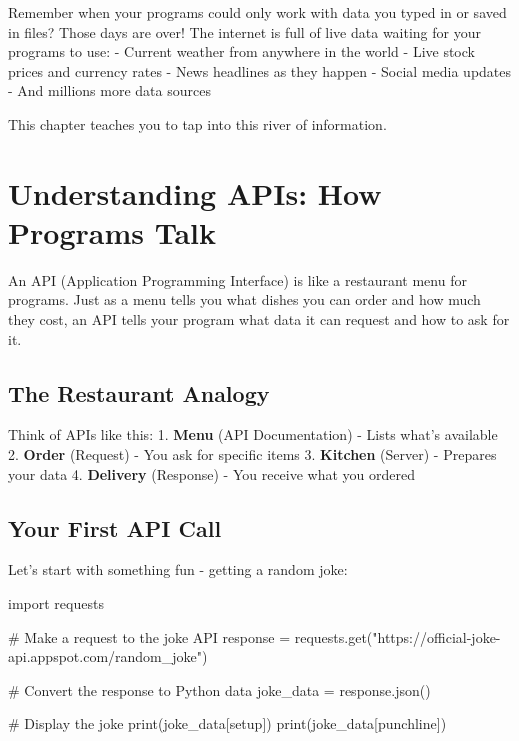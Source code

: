 \documentclass[
  letterpaper,
  DIV=11,
  numbers=noendperiod,
  oneside]{scrreprt}
\newenvironment{Shaded}{}{}
\newcommand{\BuiltInTok}[1]{\textcolor[rgb]{0.84,0.23,0.29}{#1}}
\newcommand{\CommentTok}[1]{\textcolor[rgb]{0.42,0.45,0.49}{#1}}
\newcommand{\ImportTok}[1]{\textcolor[rgb]{0.01,0.18,0.38}{#1}}
\newcommand{\NormalTok}[1]{\textcolor[rgb]{0.14,0.16,0.18}{#1}}
\newcommand{\OperatorTok}[1]{\textcolor[rgb]{0.14,0.16,0.18}{#1}}
\newcommand{\StringTok}[1]{\textcolor[rgb]{0.01,0.18,0.38}{#1}}
\begin{document}
Remember when your programs could only work with data you typed in or
saved in files? Those days are over! The internet is full of live data
waiting for your programs to use: - Current weather from anywhere in the
world - Live stock prices and currency rates - News headlines as they
happen - Social media updates - And millions more data sources

This chapter teaches you to tap into this river of information.

\section{Understanding APIs: How Programs
Talk}\label{understanding-apis-how-programs-talk}

An API (Application Programming Interface) is like a restaurant menu for
programs. Just as a menu tells you what dishes you can order and how
much they cost, an API tells your program what data it can request and
how to ask for it.

\subsection{The Restaurant Analogy}\label{the-restaurant-analogy}

Think of APIs like this: 1. \textbf{Menu} (API Documentation) - Lists
what's available 2. \textbf{Order} (Request) - You ask for specific
items 3. \textbf{Kitchen} (Server) - Prepares your data 4.
\textbf{Delivery} (Response) - You receive what you ordered

\subsection{Your First API Call}\label{your-first-api-call}

Let's start with something fun - getting a random joke:

\begin{Shaded}
\begin{Highlighting}[]
\ImportTok{import}\NormalTok{ requests}

\CommentTok{\# Make a request to the joke API}
\NormalTok{response }\OperatorTok{=}\NormalTok{ requests.get(}\StringTok{"https://official{-}joke{-}api.appspot.com/random\_joke"}\NormalTok{)}

\CommentTok{\# Convert the response to Python data}
\NormalTok{joke\_data }\OperatorTok{=}\NormalTok{ response.json()}

\CommentTok{\# Display the joke}
\BuiltInTok{print}\NormalTok{(joke\_data[}\StringTok{\textquotesingle{}setup\textquotesingle{}}\NormalTok{])}
\BuiltInTok{print}\NormalTok{(joke\_data[}\StringTok{\textquotesingle{}punchline\textquotesingle{}}\NormalTok{])}
\end{Highlighting}
\end{Shaded}
\end{document}
